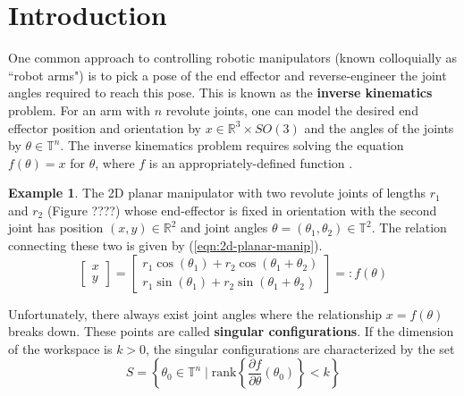 \documentclass[12pt]{article}
\theoremstyle{definition}
\newtheorem{example}{Example}
\begin{document}
\cite{program-kin-red-manips}
\cite{robots-fiber-bundles}
\cite{topology-fiber-bundles}
\cite{topology-robot-arm}
    
\section{Introduction}
One common approach to controlling robotic manipulators 
(known colloquially as ``robot arms") is to pick a pose of the end effector and
reverse-engineer the joint angles required to reach this pose. This is known as
the \textbf{inverse kinematics} problem. For an arm with \(n\) revolute joints, 
one can model the desired end effector position and orientation by
\(x \in \mathbb{R}^3 \times SO(3)\) and the angles of the joints by 
\(\theta \in \mathbb{T}^n\). The inverse kinematics problem requires solving the
equation \(f(\theta) = x\) for \(\theta\), where \(f\) is an 
appropriately-defined function \cite{program-kin-red-manips}.

\begin{example}

The 2D planar manipulator with two revolute joints of lengths \(r_1\)
and \(r_2\) (Figure ????) whose end-effector is fixed in orientation with the
second joint has position \((x,y) \in \mathbb{R}^2\) and joint angles 
\(\theta = (\theta_1,\theta_2) \in \mathbb{T}^2\). 
The relation connecting these two is given by (\ref{eqn:2d-planar-manip}).
\begin{equation}\label{eqn:2d-planar-manip}
    \begin{bmatrix}x \\ y \end{bmatrix}
    = \begin{bmatrix} 
        r_1\cos(\theta_1) + r_2\cos(\theta_1 + \theta_2) \\
        r_1\sin(\theta_1) + r_2\sin(\theta_1 + \theta_2)
    \end{bmatrix} =: f(\theta)
\end{equation}
\end{example}
Unfortunately, there always exist joint angles where the relationship 
\(x = f(\theta)\) breaks down. These points are called 
\textbf{singular configurations}. If the dimension of the workspace is 
\(k > 0\), the singular configurations are characterized by the set
\[
    S = \left\{ \theta_0 \in \mathbb{T}^n \mid 
    \text{rank}\left\{
        \frac{\partial f}{\partial\theta}(\theta_0) 
    \right\} < k \right\}
\]
\end{document}
